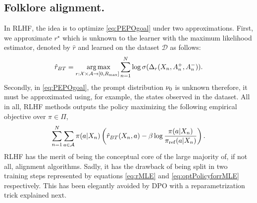 \documentclass{article}
\begin{document}
\subsection{Folklore alignment.}
In RLHF, the idea is to optimize \eqref{eq:PEPOgoal} under two approximations. First, we approximate $r^\star$ which is unknown to the learner with the maximum likelihood estimator, denoted by $\hat{r}$ and learned on the dataset $\mathcal{D}$ as follows:
\begin{equation}
\label{eq:rMLE}
\hat{r}_{BT} = \mathop{\mbox{ arg\,max}}_{r: \mathcal{X}\times\mathcal{A}\rightarrow[0,R_{\max}]} \sum^N_{n=1} \log \sigma (\Delta_r(X_n, A^+_n, A^-_n)).
\end{equation}
Secondly, in \eqref{eq:PEPOgoal}, the prompt distribution $\nu_0$ is unknown therefore, it must be approximated using, for example, the states observed in the dataset. All in all, RLHF methods outputs the policy maximizing the following empirical objective over $\pi\in \Pi$,
\begin{equation}
\label{eq:optPolicyforrMLE}\sum^N_{n=1}\sum_{a\in\mathcal{A}} \pi(a|X_n) \left({\hat{r}_{BT}(X_n,a) - \beta \log \frac{\pi(a|X_n)}{\pi_{\mathrm{ref}}(a|X_n)}}\right).   
\end{equation}
RLHF has the merit of being the conceptual core of the large majority of, if not all, alignment algorithms. Sadly, it has the drawback of being split in two training steps represented by equations \eqref{eq:rMLE} and \eqref{eq:optPolicyforrMLE} respectively. This has been elegantly avoided by DPO \citep{rafailov2023direct} with a reparametrization trick explained next.
\end{document}

